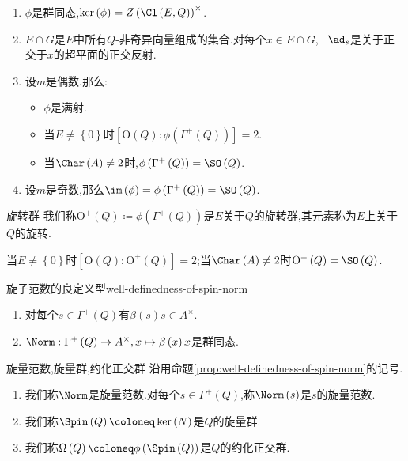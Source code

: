 \begin{theorem}{}{}
	\begin{enumerate}
		\item $\phi$是群同态,$\ker\left(\phi\right)=Z\left(\Cl\left(E,Q\right)\right)^{\times}$.
		\item $E\cap G$是$E$中所有$Q$-非奇异向量组成的集合.对每个$x\in E\cap G$,$-\ad_{s}$是关于正交于$x$的超平面的正交反射.
		\item 设$m$是偶数.那么:
		\begin{itemize}
			\item $\phi$是满射.
			\item 当$E\neq\left\{0\right\}$时$\left[\mathrm{O}\left(Q\right):\phi\left(\Gamma^{+}\left(Q\right)\right)\right]=2$.
			\item 当$\Char\left(A\right)\neq 2$时,$\phi\left(\Gamma^{+}\left(Q\right)\right)=\SO\left(Q\right)$.
		\end{itemize}
		\item 设$m$是奇数,那么$\im\left(\phi\right)=\phi\left(\Gamma^{+}\left(Q\right)\right)=\SO\left(Q\right)$.
	\end{enumerate}
\end{theorem}

\begin{definition}{旋转群}{}
	我们称$\mathrm{O}^{+}\left(Q\right)\coloneq\phi\left(\Gamma^{+}\left(Q\right)\right)$是$E$关于$Q$的旋转群,其元素称为$E$上关于$Q$的旋转.
\end{definition}

\begin{remark}{}{}
	当$E\neq\left\{0\right\}$时$\left[\mathrm{O}\left(Q\right):\mathrm{O}^{+}\left(Q\right)\right]=2$;当$\Char\left(A\right)\neq 2$时$\mathrm{O}^{+}\left(Q\right)=\SO\left(Q\right)$.
\end{remark}

\begin{proposition}{旋子范数的良定义型}{well-definedness-of-spin-norm}
	\begin{enumerate}
		\item 对每个$s\in\Gamma^{+}\left(Q\right)$有$\beta\left(s\right)s\in A^{\times}$.
		\item $\Norm:\Gamma^{+}\left(Q\right)\to A^{\times},x\mapsto\beta\left(x\right)x$是群同态.
	\end{enumerate}
\end{proposition}

\begin{definition}{旋量范数,旋量群,约化正交群}{}
	沿用命题\ref{prop:well-definedness-of-spin-norm}的记号.
	\begin{enumerate}
		\item 我们称$\Norm$是旋量范数.对每个$s\in\Gamma^{+}\left(Q\right)$,称$\Norm\left(s\right)$是$s$的旋量范数.
		\item 我们称$\Spin\left(Q\right)\coloneq\ker\left(N\right)$是$Q$的旋量群.
		\item 我们称$\Omega\left(Q\right)\coloneq\phi\left(\Spin\left(Q\right)\right)$是$Q$的约化正交群.
	\end{enumerate}
\end{definition}

